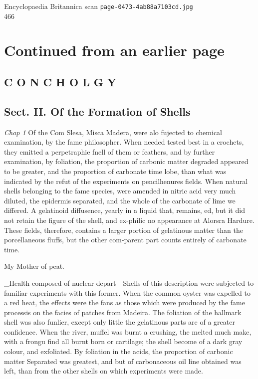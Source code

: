 \documentclass{article}
\begin{document}
\begin{center}
{\Large Encyclopaedia Britannica scan \texttt{page-0473-4ab88a7103cd.jpg}}\\[0.5em]
466
\end{center}
\section*{Continued from an earlier page}
\subsection*{C O N C H O L G Y}
\subsection*{Sect. II. Of the Formation of Shells}
\textit{Chap 1}
Of the Com Slesa, Misca Madera, were alo fujected to chemical examination, by the fame philosopher. When needed tested best in a crochets, they emitted a perpetraphie fnell of them or feathers, and by further examination, by foliation, the proportion of carbonic matter degraded appeared to be greater, and the proportion of carbonate time lobe, than what was indicated by the refut of the experiments on pencilhenures fields. When natural shells belonging to the fame species, were amended in nitric acid very much diluted, the epidermis separated, and the whole of the carbonate of lime we differed. A gelatinoid diffusence, yearly in a liquid that, remains, ed, but it did not retain the figure of the shell, and ex-philic no appearance at Alorsra Hardure. These fields, therefore, contains a larger portion of gelatinous matter than the porcellaneous fluffs, but the other com-parent part counts entirely of carbonate time.

My Mother of peat.

\_Health composed of nuclear-depart—Shells of this description were subjected to familiar experiments with this former. When the common oyster was expelled to a red heat, the effects were the fans as those which were produced by the fame processis on the facies of patches from Madeira. The foliation of the hallmark shell was also funlier, except only little the gelatinous parts are of a greater confidence. When the river, muffel was burnt a crushing, the melted much make, with a frongu find all burnt born or cartilage; the shell become of a dark gray colour, and exfoliated. By foliation in the acids, the proportion of carbonic matter Separated was greatest, and but of carbonaceous oil line obtained was left, than from the other shells on which experiments were made.
\end{document}
